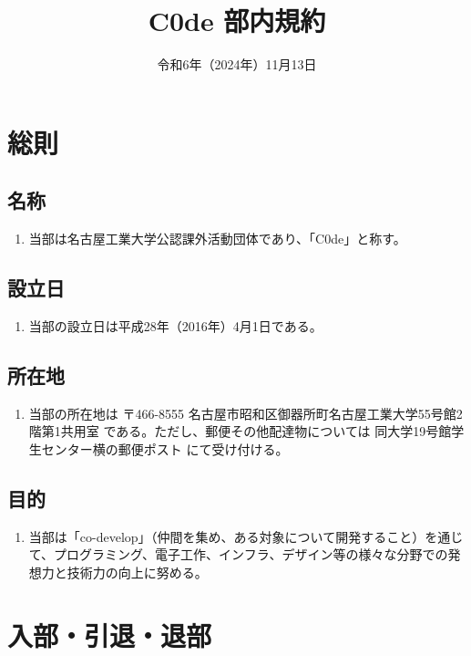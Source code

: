 \documentclass[12pt, unicode, a4paper]{ltjsreport}
\title{C0de 部内規約}
\date{令和6年（2024年）11月13日}
\begin{document}
\maketitle

\tableofcontents

\chapter{総則}
    \section{名称}
        \begin{enumerate}
            \item 当部は名古屋工業大学公認課外活動団体であり、「C0de」と称す。
        \end{enumerate}

    \section{設立日}
        \begin{enumerate}
            \item 当部の設立日は平成28年（2016年）4月1日である。
        \end{enumerate}

    \section{所在地}
        \begin{enumerate}
            \item 当部の所在地は 〒466-8555 名古屋市昭和区御器所町名古屋工業大学55号館2階第1共用室 である。ただし、郵便その他配達物については 同大学19号館学生センター横の郵便ポスト にて受け付ける。
        \end{enumerate}

    \section{目的}\label{purpose}
        \begin{enumerate}
            \item 当部は「co-develop」（仲間を集め、ある対象について開発すること）を通じて、プログラミング、電子工作、インフラ、デザイン等の様々な分野での発想力と技術力の向上に努める。
        \end{enumerate}


\chapter{入部・引退・退部}
\end{document}
